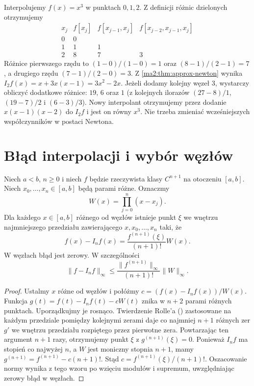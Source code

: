 \begin{przyklad}
\label{ma2:ex:approx-newton-table}
Interpolujemy $f(x)=x^3$ w punktach $0,1,2$.
Z definicji różnic dzielonych otrzymujemy
\[
\begin{array}{c|r|r|r}
 x_j&f[x_j]&f[x_{j-1},x_j]&f[x_{j-2},x_{j-1},x_j]\\ \hline
 0&0&&\\
 1&1&1&\\
 2&8&7&3
\end{array}
\]
Różnice pierwszego rzędu to $(1-0)/(1-0)=1$
oraz $(8-1)/(2-1)=7$, a drugiego rzędu
$(7-1)/(2-0)=3$.
Z \ref{ma2:thm:approx-newton} wynika
$I_2f(x)=x+3x(x-1)=3x^2-2x$.
Jeżeli dodamy kolejny węzeł $3$, wystarczy
obliczyć dodatkowe różnice: $19$, $6$ oraz $1$
(z kolejnych ilorazów $(27-8)/1$,
$(19-7)/2$ i $(6-3)/3$).
Nowy interpolant otrzymujemy przez dodanie
$x(x-1)(x-2)$ do $I_2f$ i jest on równy $x^3$.
Nie trzeba zmieniać wcześniejszych współczynników
w postaci Newtona.
\end{przyklad}

\section{Błąd interpolacji i wybór węzłów}

\begin{twierdzenie}
\label{ma2:thm:approx-interpolation-remainder}
Niech $a<b$, $n\ge0$ i niech $f$ będzie rzeczywista
klasy $C^{n+1}$ na otoczeniu $[a,b]$.
Niech $x_0,\ldots,x_n\in[a,b]$
będą parami różne. Oznaczmy
\[
 W(x)=\prod_{j=0}^n(x-x_j).
\]
Dla każdego $x\in[a,b]$ różnego od węzłów
istnieje punkt $\xi$ we wnętrzu najmniejszego
przedziału zawierającego $x,x_0,\ldots,x_n$ taki, że
\[
 f(x)-I_nf(x)=\frac{f^{(n+1)}(\xi)}{(n+1)!}W(x).
\]
W węzłach błąd jest zerowy. W szczególności
\[
 \|f-I_nf\|_\infty
 \le\frac{\|f^{(n+1)}\|_\infty}{(n+1)!}\|W\|_\infty .
\]
\end{twierdzenie}
\begin{proof}
Ustalmy $x$ różne od węzłów i połóżmy
$c=(f(x)-I_nf(x))/W(x)$.
Funkcja
$g(t)=f(t)-I_nf(t)-cW(t)$
znika w $n+2$ parami różnych punktach.
Uporządkujmy je rosnąco. Twierdzenie Rolle'a ()
zastosowane na każdym przedziale pomiędzy
kolejnymi zerami daje co najmniej $n+1$
różnych zer $g'$ we wnętrzu przedziału
rozpiętego przez pierwotne zera.
Powtarzając ten argument $n+1$ razy,
otrzymujemy punkt $\xi$ z $g^{(n+1)}(\xi)=0$.
Ponieważ $I_nf$ ma stopień co najwyżej $n$,
a $W$ jest moniczny stopnia $n+1$,
mamy $g^{(n+1)}=f^{(n+1)}-c(n+1)!$.
Stąd $c=f^{(n+1)}(\xi)/(n+1)!$.
Oszacowanie normy wynika z tego wzoru
po wzięciu modułów i supremum, uwzględniając
zerowy błąd w węzłach.
\end{proof}

